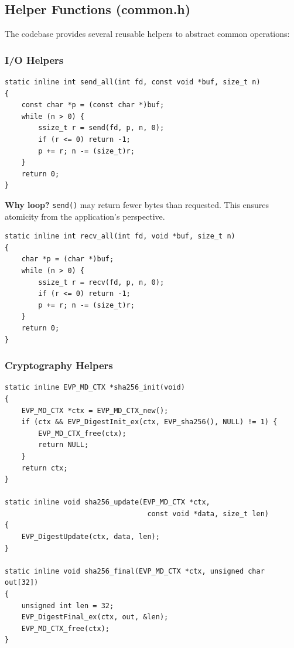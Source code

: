 \documentclass[12pt,a4paper]{article}
\begin{document}
\subsection{Helper Functions (common.h)}

The codebase provides several reusable helpers to abstract common operations:

\subsubsection{I/O Helpers}

\begin{lstlisting}[caption=send\_all() – Send Exactly n Bytes,label=lst:send_all]
static inline int send_all(int fd, const void *buf, size_t n)
{
    const char *p = (const char *)buf;
    while (n > 0) {
        ssize_t r = send(fd, p, n, 0);
        if (r <= 0) return -1;
        p += r; n -= (size_t)r;
    }
    return 0;
}
\end{lstlisting}

\textbf{Why loop?} \texttt{send()} may return fewer bytes than requested. This ensures atomicity from the application's perspective.

\begin{lstlisting}[caption=recv\_all() – Receive Exactly n Bytes,label=lst:recv_all]
static inline int recv_all(int fd, void *buf, size_t n)
{
    char *p = (char *)buf;
    while (n > 0) {
        ssize_t r = recv(fd, p, n, 0);
        if (r <= 0) return -1;
        p += r; n -= (size_t)r;
    }
    return 0;
}
\end{lstlisting}

\subsubsection{Cryptography Helpers}

\begin{lstlisting}[caption=SHA-256 Wrapper Functions,label=lst:sha256]
static inline EVP_MD_CTX *sha256_init(void)
{
    EVP_MD_CTX *ctx = EVP_MD_CTX_new();
    if (ctx && EVP_DigestInit_ex(ctx, EVP_sha256(), NULL) != 1) {
        EVP_MD_CTX_free(ctx);
        return NULL;
    }
    return ctx;
}

static inline void sha256_update(EVP_MD_CTX *ctx, 
                                  const void *data, size_t len)
{
    EVP_DigestUpdate(ctx, data, len);
}

static inline void sha256_final(EVP_MD_CTX *ctx, unsigned char out[32])
{
    unsigned int len = 32;
    EVP_DigestFinal_ex(ctx, out, &len);
    EVP_MD_CTX_free(ctx);
}
\end{lstlisting}
\end{document}
